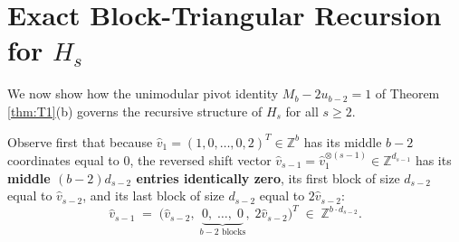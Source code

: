 \documentclass[11pt,a4paper]{article}
\theoremstyle{plain}
\theoremstyle{definition}
\newcommand{\Z}{\mathbb{Z}}
\begin{document}
\section{Exact Block-Triangular Recursion for \texorpdfstring{$H_s$}{H\_s}}

We now show how the unimodular pivot identity $M_b - 2 u_{b-2} = 1$ of Theorem \ref{thm:T1}(b) governs the recursive structure of $H_s$ for all $s \ge 2$.

Observe first that because $\hat{v}_1 = (1, 0, \dots, 0, 2)^T \in \Z^b$ has its middle $b-2$ coordinates equal to $0$, the reversed shift vector $\hat{v}_{s-1} = \hat{v}_1^{\otimes (s-1)} \in \Z^{d_{s-1}}$ has its \textbf{middle $(b-2)d_{s-2}$ entries identically zero}, its first block of size $d_{s-2}$ equal to $\hat{v}_{s-2}$, and its last block of size $d_{s-2}$ equal to $2\hat{v}_{s-2}$:
\begin{equation}\label{eq:vhat-structure}
\hat{v}_{s-1} \;=\; \big(\hat{v}_{s-2},\; \underbrace{0,\; \dots,\; 0}_{b-2 \text{ blocks}},\; 2\hat{v}_{s-2}\big)^T \;\in\; \Z^{b \cdot d_{s-2}}.
\end{equation}
\end{document}
